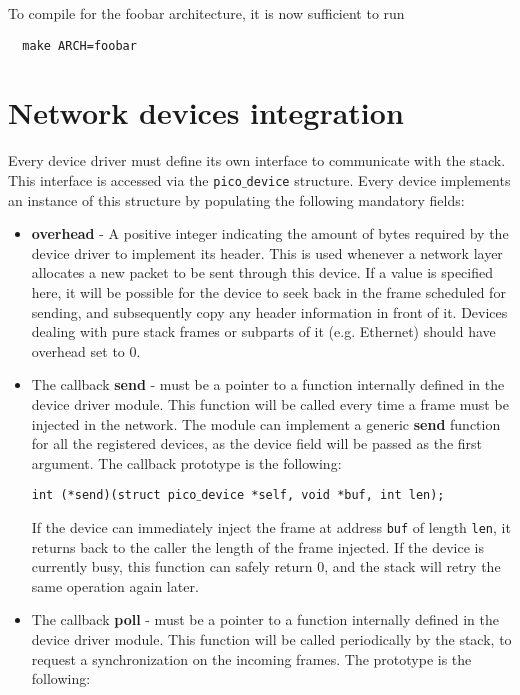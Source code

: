 To compile for the foobar architecture, it is now sufficient to run

\begin{verbatim}
  make ARCH=foobar
\end{verbatim}


\section{Network devices integration}
Every device driver must define its own interface to communicate with the stack.
This interface is accessed via the \texttt{pico$\_$device} structure. Every device implements
an instance of this structure by populating the following mandatory fields:

\begin{itemize}
\item \textbf{overhead} - A positive integer indicating the amount of bytes required by the
device driver to implement its header. This is used whenever a network layer allocates a new
packet to be sent through this device. If a value is specified here, it will be possible for
the device to seek back in the frame scheduled for sending, and subsequently copy any header
information in front of it. Devices dealing with pure stack frames or subparts of it
(e.g. Ethernet) should have overhead set to 0.

\item The callback \textbf{send} - must be a pointer to a function internally defined in the
device driver module. This function will be called every time a frame must be injected in the
network. The module can implement a generic \textbf{send} function for all the registered devices, as
the device field will be passed as the first argument. The callback prototype is the following:

 \texttt{int (*send)(struct pico$\_$device *self, void *buf, int len);}

If the device can immediately inject the frame at address \texttt{buf} of length \texttt{len},
it returns back to the caller the length of the frame injected. If the device is currently busy,
this function can safely return 0, and the stack will retry the same operation again later.

\item The callback \textbf{poll} - must be a pointer to a function internally defined in the
device driver module. This function will be called periodically by the stack, to request a
synchronization on the incoming frames. The prototype is the following:


\end{itemize}
